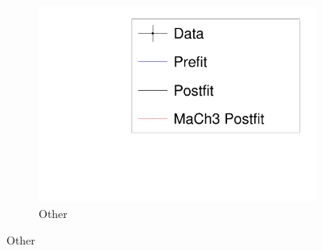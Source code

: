 \begin{figure}
\begin{subfigure}[t]{0.32\textwidth}
		\includegraphics[width=\textwidth, trim={5mm 3mm 15mm 10mm}, clip, page=4]{figures/mach3/banff/mach3banff_mom}
		\caption{Other}
	\end{subfigure}
	

\end{figure}
